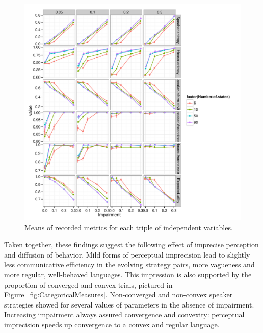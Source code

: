 \begin{figure}
  \centering
  
  \includegraphics[width=\textwidth]{plots/MeanMetrics.pdf}

  \caption{Means of recorded metrics for each triple of independent variables.}
  \label{fig:MeanMetrics}
\end{figure}


Taken together, these findings suggest the following effect of
imprecise perception and diffusion of behavior. Mild forms of
perceptual imprecision lead to slightly less communicative efficiency
in the evolving strategy pairs, more vagueness and more regular,
well-behaved languages. This impression is also supported by the
proportion of converged and convex trials, pictured in
Figure~\ref{fig:CategoricalMeasures}. Non-converged and non-convex
speaker strategies showed for several values of parameters in the
absence of impairment. Increasing impairment always assured
convergence and convexity: perceptual imprecision speeds up
convergence to a convex and regular language.

